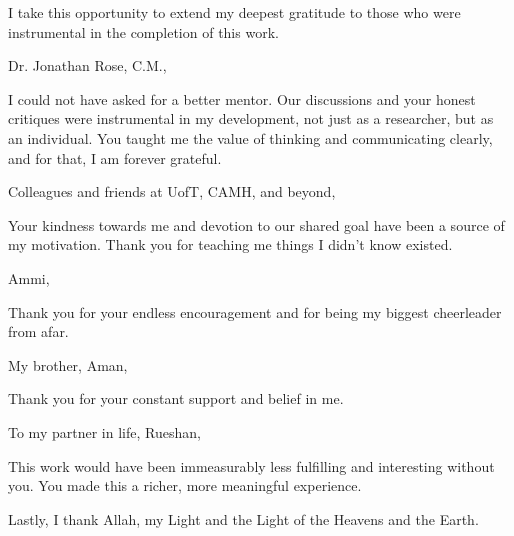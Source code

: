 \noindent I take this opportunity to extend my deepest gratitude to those who were instrumental in the completion of this work.\par

\noindent Dr. Jonathan Rose, C.M.,\vspace{-5pt}
\begin{addmargin}[1em]{2em}
        I could not have asked for a better mentor. Our discussions and your honest critiques were instrumental in my development, not just as a researcher, but as an individual. You taught me the value of thinking and communicating clearly, and for that, I am forever grateful.\par
\end{addmargin}

\noindent Colleagues and friends at UofT, CAMH, and beyond,\vspace{-5pt}
\begin{addmargin}[1em]{2em}
        \indent Your kindness towards me and devotion to our shared goal have been a source of my motivation. Thank you for teaching me things I didn't know existed.\par
\end{addmargin}

\noindent Ammi,\vspace{-5pt}
\begin{addmargin}[1em]{2em}
        Thank you for your endless encouragement and for being my biggest cheerleader from afar.\par
\end{addmargin}

\noindent My brother, Aman,\vspace{-5pt}
\begin{addmargin}[1em]{2em}
        Thank you for your constant support and belief in me.\par
\end{addmargin}


\noindent To my partner in life, Rueshan,\vspace{-5pt}
\begin{addmargin}[1em]{2em}
        \indent This work would have been immeasurably less fulfilling and interesting without you. You made this a richer, more meaningful experience.\par
\end{addmargin}

\noindent Lastly, I thank Allah, my Light and the Light of the Heavens and the Earth.
